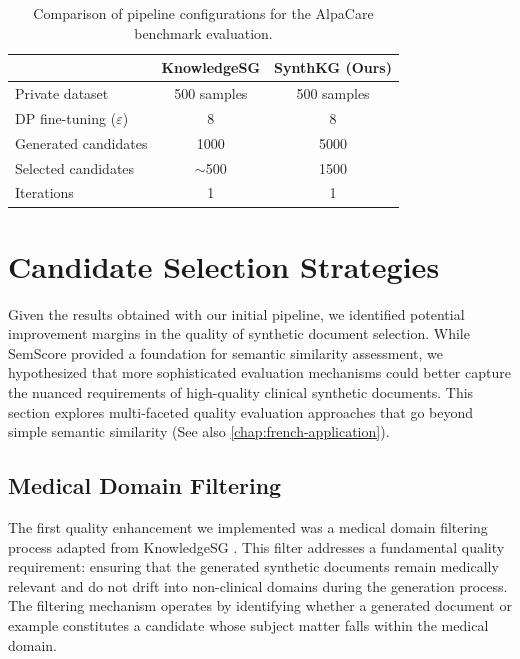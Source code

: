 \begin{table}[h]
\centering
\begin{tabular}{@{}lcc@{}}
\toprule
 & \textbf{KnowledgeSG} & \textbf{SynthKG (Ours)} \\
\midrule
Private dataset & \num{500} samples & \num{500} samples \\
DP fine-tuning ($\varepsilon$) & 8 & 8 \\
Generated candidates & \num{1000} & \num{5000} \\
Selected candidates & $\sim$\num{500} & \num{1500} \\
Iterations & 1 & 1 \\
\bottomrule
\end{tabular}
\caption{Comparison of pipeline configurations for the AlpaCare benchmark evaluation.}
\label{tab:pipeline-comparison}
\end{table}

\section{Candidate Selection Strategies}
\label{sec:quality-eval}

Given the results obtained with our initial pipeline, we identified potential improvement margins in the quality of synthetic document selection. While SemScore provided a foundation for semantic similarity assessment, we hypothesized that more sophisticated evaluation mechanisms could better capture the nuanced requirements of high-quality clinical synthetic documents. This section explores multi-faceted quality evaluation approaches that go beyond simple semantic similarity (See also \autoref{chap:french-application}).

\subsection{Medical Domain Filtering}

The first quality enhancement we implemented was a medical domain filtering process adapted from KnowledgeSG \cite{wangKnowledgeSGPrivacyPreservingSynthetic2024}. This filter addresses a fundamental quality requirement: ensuring that the generated synthetic documents remain medically relevant and do not drift into non-clinical domains during the generation process. The filtering mechanism operates by identifying whether a generated document or example constitutes a candidate whose subject matter falls within the medical domain.

